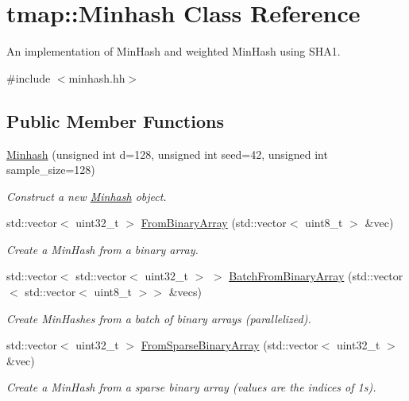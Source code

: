 \hypertarget{classtmap_1_1Minhash}{}\section{tmap\+:\+:Minhash Class Reference}
\label{classtmap_1_1Minhash}


An implementation of Min\+Hash and weighted Min\+Hash using S\+H\+A1.  




{\ttfamily \#include $<$minhash.\+hh$>$}

\subsection*{Public Member Functions}
\begin{DoxyCompactItemize}
\item 
\hyperlink{classtmap_1_1Minhash_ae35f57de5ec2316538384c9d2f588d52}{Minhash} (unsigned int d=128, unsigned int seed=42, unsigned int sample\+\_\+size=128)
\begin{DoxyCompactList}\small\item\em Construct a new \hyperlink{classtmap_1_1Minhash}{Minhash} object. \end{DoxyCompactList}\item 
std\+::vector$<$ uint32\+\_\+t $>$ \hyperlink{classtmap_1_1Minhash_a1418049bb8c8f70255c336e58a9b9fec}{From\+Binary\+Array} (std\+::vector$<$ uint8\+\_\+t $>$ \&vec)
\begin{DoxyCompactList}\small\item\em Create a Min\+Hash from a binary array. \end{DoxyCompactList}\item 
std\+::vector$<$ std\+::vector$<$ uint32\+\_\+t $>$ $>$ \hyperlink{classtmap_1_1Minhash_a083c1328a9830ec585613c213b1730cc}{Batch\+From\+Binary\+Array} (std\+::vector$<$ std\+::vector$<$ uint8\+\_\+t $>$$>$ \&vecs)
\begin{DoxyCompactList}\small\item\em Create Min\+Hashes from a batch of binary arrays (parallelized). \end{DoxyCompactList}\item 
std\+::vector$<$ uint32\+\_\+t $>$ \hyperlink{classtmap_1_1Minhash_aec48525d1c8006f573b0c534e53d894a}{From\+Sparse\+Binary\+Array} (std\+::vector$<$ uint32\+\_\+t $>$ \&vec)
\begin{DoxyCompactList}\small\item\em Create a Min\+Hash from a sparse binary array (values are the indices of 1s). \end{DoxyCompactList}\item 
$$
\end{DoxyCompactItemize}
